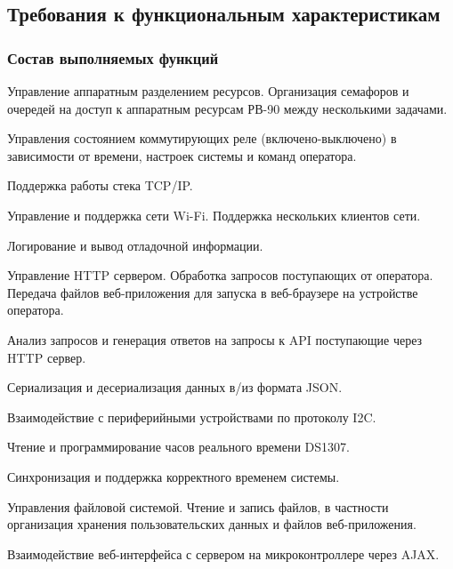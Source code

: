 \subsection{Требования к функциональным характеристикам}
\subsubsection{Состав выполняемых функций}

\begin{my_enumerate}
\item Управление аппаратным разделением ресурсов. Организация семафоров и очередей на доступ к аппаратным ресурсам РВ-90 между несколькими задачами.
\item Управления состоянием коммутирующих реле (включено-выключено) в зависимости от времени, настроек системы и команд оператора.
\item Поддержка работы стека TCP/IP.
\item Управление и поддержка сети Wi-Fi. Поддержка нескольких клиентов сети.
\item Логирование и вывод отладочной информации.
\item Управление HTTP сервером. Обработка запросов поступающих от оператора. Передача файлов веб-приложения для запуска в веб-браузере на устройстве оператора. 
\item Анализ запросов и генерация ответов на запросы к API поступающие через HTTP сервер.
\item Сериализация и десериализация данных в/из формата JSON.
\item Взаимодействие с периферийными устройствами по протоколу I2C.
\item Чтение и программирование часов реального времени DS1307.
\item Синхронизация и поддержка корректного временем системы.
\item Управления файловой системой. Чтение и запись файлов, в частности организация хранения пользовательских данных и файлов веб-приложения.
\item Взаимодействие веб-интерфейса с сервером на микроконтроллере через AJAX.
\end{my_enumerate}

